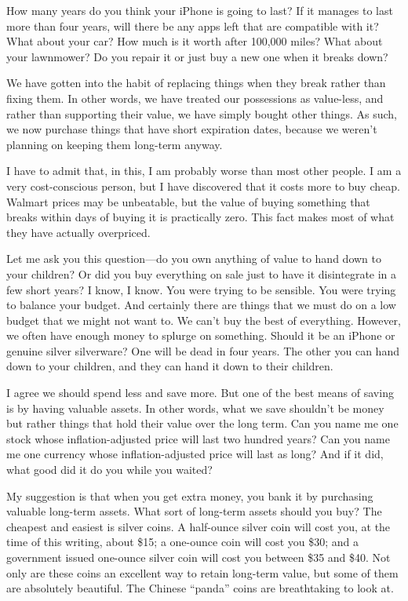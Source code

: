 How many years do you think your iPhone is going to last? If it manages
to last more than four years, will there be any apps left that are
compatible with it? What about your car? How much is it worth after
100,000 miles? What about your lawnmower? Do you repair it or just buy
a new one when it breaks down?

We have gotten into the habit of replacing things when they break rather
than fixing them. In other words, we have treated our possessions as
value-less, and rather than supporting their value, we have simply
bought other things. As such, we now purchase things that have short
expiration dates, because we weren’t planning on keeping them long-term
anyway. 

I have to admit that, in this, I am probably worse than most other
people. I am a very cost-conscious person, but I have discovered that
it costs more to buy cheap. Walmart prices may be unbeatable, but the
value of buying something that breaks within days of buying it is
practically zero.  This fact makes most of what they have actually
overpriced. 

Let me ask you this question—do you own anything of value to hand down
to your children?  Or did you buy everything on sale just to have it
disintegrate in a few short years?  I know, I know. You were trying to
be sensible. You were trying to balance your budget. And certainly
there are things that we must do on a low budget that we might not want
to. We can’t buy the best of everything. However, we often have enough
money to splurge on something. Should it be an iPhone or genuine silver
silverware?  One will be dead in four years. The other you can hand
down to your children, and they can hand it down to their children.

I agree we should spend less and save more. But one of the best means of
saving is by having valuable assets. In other words, what we save
shouldn’t be money but rather things that hold their value over the
long term. Can you name me one stock whose inflation-adjusted price
will last two hundred years?  Can you name me one currency whose
inflation-adjusted price will last as long?  And if it did, what good
did it do you while you waited?

My suggestion is that when you get extra money, you bank it by
purchasing valuable long-term assets. What sort of long-term assets
should you buy? The cheapest and easiest is silver coins. A half-ounce
silver coin will cost you, at the time of this writing, about \$15; a
one-ounce coin will cost you \$30; and a government issued one-ounce
silver coin will cost you between \$35 and \$40. Not only are these
coins an excellent way to retain long-term value, but some of them are
absolutely beautiful. The Chinese “panda” coins are breathtaking to
look at.

